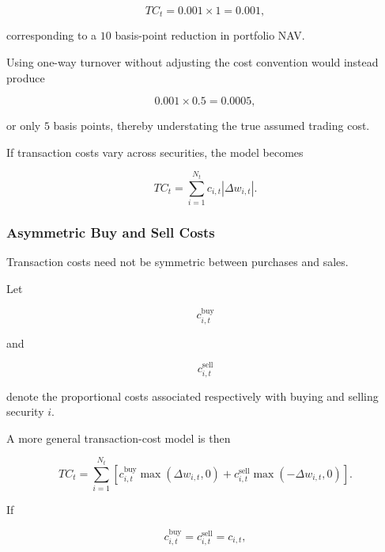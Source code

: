\documentclass[11pt,a4paper]{article}
\begin{document}
\begin{equation}
TC_t
=
0.001\times 1
=
0.001,
\end{equation}

corresponding to a $10$ basis-point reduction in portfolio NAV.

Using one-way turnover without adjusting the cost convention would instead
produce

\begin{equation}
0.001\times 0.5
=
0.0005,
\end{equation}

or only $5$ basis points, thereby understating the true assumed trading cost.

If transaction costs vary across securities, the model becomes

\begin{equation}
\boxed{
TC_t
=
\sum_{i=1}^{N_t}
c_{i,t}
|\Delta w_{i,t}|.
}
\end{equation}


\subsubsection{Asymmetric Buy and Sell Costs}

Transaction costs need not be symmetric between purchases and sales.

Let

\begin{equation}
c_{i,t}^{\mathrm{buy}}
\end{equation}

and

\begin{equation}
c_{i,t}^{\mathrm{sell}}
\end{equation}

denote the proportional costs associated respectively with buying and selling
security $i$.

A more general transaction-cost model is then

\begin{equation}
\boxed{
TC_t
=
\sum_{i=1}^{N_t}
\left[
c_{i,t}^{\mathrm{buy}}
\max(\Delta w_{i,t},0)
+
c_{i,t}^{\mathrm{sell}}
\max(-\Delta w_{i,t},0)
\right].
}
\end{equation}

If

\begin{equation}
c_{i,t}^{\mathrm{buy}}
=
c_{i,t}^{\mathrm{sell}}
=
c_{i,t},
\end{equation}
\end{document}
